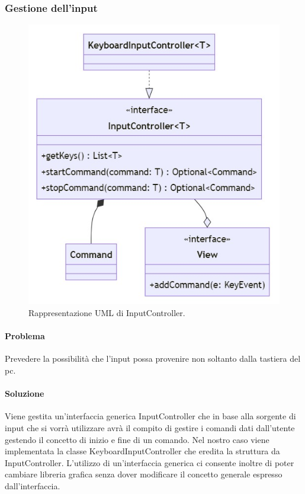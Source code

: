 \documentclass[a4paper,12pt]{report}
\begin{document}
\subsubsection*{Gestione dell’input}
%
\begin{figure}[H]
	\centering{}
	\includegraphics[scale=0.40]{img/input.jpg}
	\caption{Rappresentazione UML di InputController.}
	\end{figure}
%
\paragraph*{Problema} Prevedere la possibilità che l’input possa provenire non soltanto dalla tastiera del pc.
\paragraph*{Soluzione} Viene gestita un’interfaccia generica InputController che in base alla sorgente di input che si vorrà utilizzare avrà il compito di gestire i comandi dati dall’utente gestendo il concetto di inizio e fine di un comando. Nel nostro caso viene implementata la classe KeyboardInputController che eredita la struttura da InputController. L’utilizzo di un’interfaccia generica ci consente inoltre di poter cambiare libreria grafica senza dover modificare il concetto generale espresso dall’interfaccia.
%
\newpage
\end{document}
